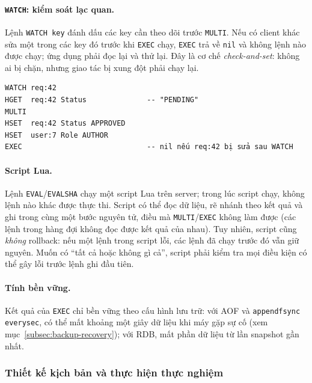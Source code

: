\paragraph{\texttt{WATCH}: kiểm soát lạc quan.} Lệnh \texttt{WATCH key} đánh dấu các key cần theo dõi trước \texttt{MULTI}. Nếu có client khác sửa một trong các key đó trước khi \texttt{EXEC} chạy, \texttt{EXEC} trả về \texttt{nil} và không lệnh nào được chạy; ứng dụng phải đọc lại và thử lại. Đây là cơ chế \emph{check-and-set}: không ai bị chặn, nhưng giao tác bị xung đột phải chạy lại.

\begin{verbatim}
WATCH req:42
HGET  req:42 Status              -- "PENDING"
MULTI
HSET  req:42 Status APPROVED
HSET  user:7 Role AUTHOR
EXEC                             -- nil nếu req:42 bị sửa sau WATCH
\end{verbatim}

\paragraph{Script Lua.} Lệnh \texttt{EVAL}/\texttt{EVALSHA} chạy một script Lua trên server; trong lúc script chạy, không lệnh nào khác được thực thi. Script có thể đọc dữ liệu, rẽ nhánh theo kết quả và ghi trong cùng một bước nguyên tử, điều mà \texttt{MULTI}/\texttt{EXEC} không làm được (các lệnh trong hàng đợi không đọc được kết quả của nhau). Tuy nhiên, script cũng \emph{không} rollback: nếu một lệnh trong script lỗi, các lệnh đã chạy trước đó vẫn giữ nguyên. Muốn có ``tất cả hoặc không gì cả'', script phải kiểm tra mọi điều kiện có thể gây lỗi trước lệnh ghi đầu tiên.

\paragraph{Tính bền vững.} Kết quả của \texttt{EXEC} chỉ bền vững theo cấu hình lưu trữ: với AOF và \texttt{appendfsync everysec}, có thể mất khoảng một giây dữ liệu khi máy gặp sự cố (xem mục~\ref{subsec:backup-recovery}); với RDB, mất phần dữ liệu từ lần snapshot gần nhất.

\subsubsection{Thiết kế kịch bản và thực hiện thực nghiệm}
\label{subsubsec:tx-experiment}
